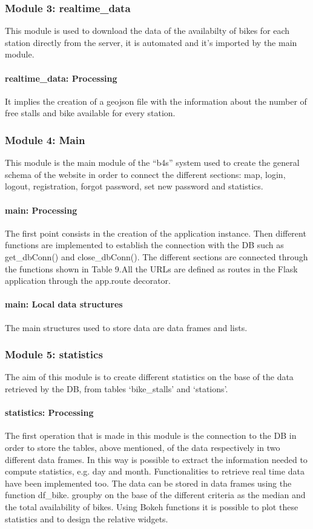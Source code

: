 \documentclass{article}
\begin{document}
\subsubsection{Module 3: realtime\_data}
This module is used to download the data of the availabilty of bikes for each station directly from the server, it is automated and it’s imported by the main module.

\paragraph{realtime\_data: Processing}
It implies the creation of a geojson file with the information about the number of free stalls and bike available for every station.

\subsubsection{Module 4: Main}
This module is the main module of the “b4s” system used to create the general schema of the website in order to connect the different sections: map, login, logout, registration, forgot password, set new password and statistics.
\paragraph{main: Processing}
The first point consists in the creation of the application instance. Then different functions are implemented to establish the connection with the DB such as get\_dbConn() and close\_dbConn(). The different sections are connected through the functions shown in Table 9.All the URLs are defined as routes in the Flask application through the app.route decorator. 
\paragraph{main: Local data structures}
The main structures used to store data are data frames and lists.

\subsubsection{Module 5: statistics}
The aim of  this module is to create different statistics on the base of the data retrieved by the DB, from tables ‘bike\_stalls’ and ‘stations’.
\paragraph{statistics: Processing}
The first operation that is made in this module is the connection to the DB in order to store the tables, above mentioned, of the data respectively in two different data frames. In this way is possible to extract the information needed to compute statistics, e.g. day and month. Functionalities to retrieve real time data have been implemented too. The data can be stored in data frames using the function df\_bike. groupby on the base of the different criteria as the median and the total availability of bikes. Using Bokeh functions it is possible to plot these statistics and to design the relative widgets. 
\end{document}
